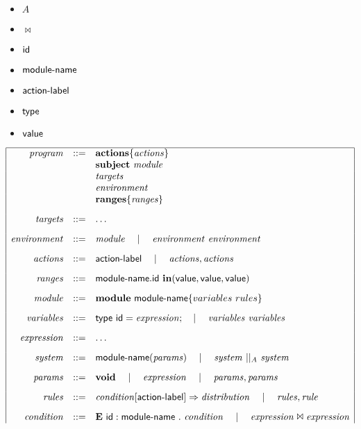 \begin{itemize}
	\item $A$
	\item $\Join$
	\item ${\sf id}$
	\item ${\sf module}\textrm{-}{\sf name}$
	\item ${\sf action}\textrm{-}{\sf label}$
	\item ${\sf type}$
	\item ${\sf value}$
\end{itemize}

\begin{table} %
$$
\begin{array}{|rcl|}
\hline
\mathit{program} &::=& \mathbf{actions} \{ \mathit{actions} \} \\
	&& \mathbf{subject} \Space \mathit{module} \\
	&& \mathit{targets} \\
	&& \mathit{environment} \\
	&& \mathbf{ranges} \{ \mathit{ranges} \}
	\\[.3cm]
\mathit{targets} &::=& \dots
	\\[.3cm]	
\mathit{environment} &::=& \mathit{module} \Sep \mathit{environment} \Space \mathit{environment}
	\\[.3cm]
\mathit{actions} &::=& \x{action}\textrm{-}\x{label} \Sep \mathit{actions} , \mathit{actions}
	\\[.3cm]
\mathit{ranges} &::=& \x{module}\textrm{-}\x{name} . \x{id} \Space \mathbf{in} ( \x{value} , \x{value}, \x{value} )
	\\[.3cm]
\mathit{module} &::=& \mathbf{module} \Space \x{module}\textrm{-}\x{name} \{ variables \Space rules \}
	\\[.3cm]
\mathit{variables} &::=& \x{type} \Space \x{id} = \mathit{expression}; \Sep \mathit{variables} \Space \mathit{variables}
	\\[.3cm]
\mathit{expression} &::=& \dots
	\\[.3cm]
\mathit{system} &::=& \x{module}\textrm{-}\x{name}(\mathit{params}) \Sep \mathit{system} \Par{A} \mathit{system}
	\\[.3cm]
\mathit{params} &::=& \mathbf{void} \Sep \mathit{expression} \Sep \mathit{params}, \mathit{params}
	\\[.3cm]
\mathit{rules} &::=& \mathit{condition} [ \x{action}\textrm{-}\x{label}]\Rightarrow \mathit{distribution} \Sep \mathit{rules},\mathit{rule}
	\\[.3cm]
\mathit{condition} &::=& \mathbf{E} \Space \x{id}:\x{module}\textrm{-}\x{name} \Space . \Space \mathit{condition} \Sep \mathit{expression} \Join \mathit{expression} \\

\end{array}$$
\end{table}
